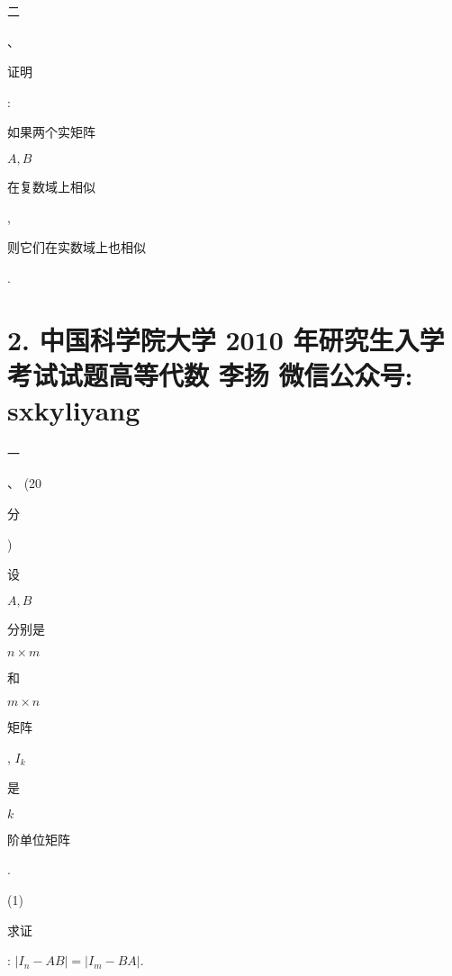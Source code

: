\documentclass[10pt]{article}
\begin{document}
\begin{CJK}{UTF8}{mj}二\end{CJK}、\begin{CJK}{UTF8}{mj}证明\end{CJK}: \begin{CJK}{UTF8}{mj}如果两个实矩阵\end{CJK} $A, B$ \begin{CJK}{UTF8}{mj}在复数域上相似\end{CJK}, \begin{CJK}{UTF8}{mj}则它们在实数域上也相似\end{CJK}.

\section{2. 中国科学院大学 2010 年研究生入学考试试题高等代数 李扬 微信公众号: sxkyliyang}
\begin{CJK}{UTF8}{mj}一\end{CJK}、 (20 \begin{CJK}{UTF8}{mj}分\end{CJK}) \begin{CJK}{UTF8}{mj}设\end{CJK} $A, B$ \begin{CJK}{UTF8}{mj}分别是\end{CJK} $n \times m$ \begin{CJK}{UTF8}{mj}和\end{CJK} $m \times n$ \begin{CJK}{UTF8}{mj}矩阵\end{CJK}, $I_{k}$ \begin{CJK}{UTF8}{mj}是\end{CJK} $k$ \begin{CJK}{UTF8}{mj}阶单位矩阵\end{CJK}.

(1) \begin{CJK}{UTF8}{mj}求证\end{CJK}: $\left|I_{n}-A B\right|=\left|I_{m}-B A\right|$.
\end{document}
